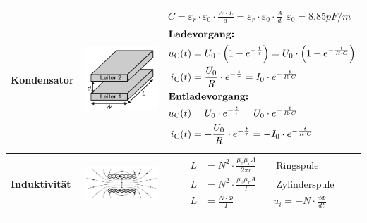 \begin{longtable}{|>{\bfseries}p{3cm}|c|p{10cm}|}
    \\ \hline
    Kondensator
    & \includegraphics[width=4cm, valign=t]{pictures/kapazitaetswert.png}
    & {$C=\varepsilon_{r}\cdot \varepsilon_{0}\cdot \frac{W\cdot L}{d}=\varepsilon_{r}\cdot \varepsilon_{0}\cdot \frac{A}{d}$ \qquad $\varepsilon_{0}= 8.85 pF/m$\newline
       \newline
       \begin{align*}
           \intertext{\textbf{Ladevorgang:}}
           u_{\mathrm{C}} (t) &= U_0 \cdot \left( 1 - e^{- \frac{t}{\tau}}\right)  = U_0 \cdot \left( 1 - e^{- \frac{t}{R \cdot C}}\right)\\
           i_{\mathrm{C}} (t) &= \frac{U_0}{R} \cdot e^{- \frac{t}{\tau}} = I_0 \cdot e^{- \frac{t}{R \cdot C}}\\
           \intertext{\textbf{Entladevorgang:}}
           u_{\mathrm{C}} (t) &= U_0 \cdot e^{- \frac{t}{\tau}} = U_0 \cdot e^{-\frac{t}{R \cdot C}}\\
           i_{\mathrm{C}} (t) &= -\frac{U_0}{R} \cdot e^{- \frac{t}{\tau}} = - I_0 \cdot e^{-\frac{t}{R \cdot C}}
       \end{align*}
      }
    \\ \hline
    Induktivität
    & \includegraphics[width=4cm, valign=t]{pictures/induktivitaet.png}
    & {\begin{align*}
           L &=N^2\cdot\frac{\mu_{0}\mu_{r}A}{2\pi r} \qquad \text{Ringspule} \\
           L &=N^2\cdot\frac{\mu_{0}\mu_{r}A}{l} \qquad \text{Zylinderspule} \\
           L &=\frac{N\cdot\Phi}{I} \qquad \qquad u_{i} =-N\cdot\frac{d\Phi}{dt}\\

\end{align*}}
\end{longtable}
